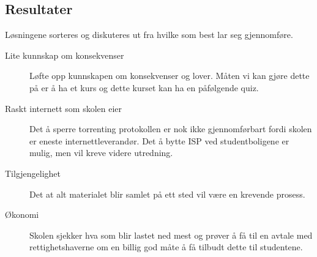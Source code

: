 



\subsection{Resultater}
Løsningene sorteres og diskuteres ut fra hvilke som best lar seg gjennomføre. 
\begin{description}
    \item[Lite kunnskap om konsekvenser] Løfte opp kunnskapen om konsekvenser og lover.  Måten vi kan gjøre dette på er å ha et kurs og dette kurset kan ha en påfølgende quiz.
    \item[Raskt internett som skolen eier] Det å sperre torrenting protokollen er nok ikke gjennomførbart fordi skolen er eneste internettleverandør. Det å bytte ISP ved studentboligene er mulig, men vil kreve videre utredning.
    \item[Tilgjengelighet] Det at alt materialet blir samlet på ett sted vil være en krevende prosess.
    \item[Økonomi] Skolen sjekker hva som blir lastet ned mest og prøver å få til en avtale med rettighetshaverne om en billig god måte å få tilbudt dette til studentene.
\end{description}




